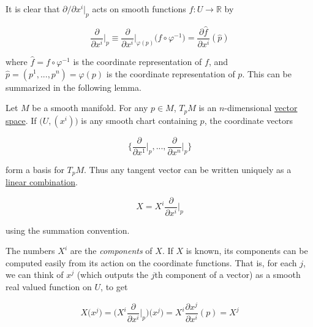 \documentclass{article}
\begin{document}
    It is clear that $\partial / \partial x^i \big|_p $ acts on smooth functions $f: U \to \mathbb{R}$ by

      \begin{equation}
        \frac{\partial}{\partial x^i} \bigg|_p \equiv \frac{\partial}{\partial x^i} \bigg|_{\varphi(p)} \big( f \circ \varphi^{-1} \big) = \frac{\partial \hat{f}}{\partial x^i} (\hat{p})
      \end{equation}

    where $\hat{f} = f \circ \varphi^{-1}$ is the coordinate representation of $f$, and $\hat{p} = (p^1, ..., p^n) = \varphi(p)$ is the coordinate representation of $p$. This can be summarized in the following lemma. 

    \begin{lemma}
      \label{thm:dimension-and-coordinate-basis-of-tpm}
      Let $M$ be a smooth manifold. For any $p \in M$, $T_p M$ is an $n$-dimensional \hyperref[lin-def:vector-space]{vector space}. If $\big( U, (x^i)\big)$ is any smooth chart containing $p$, the coordinate vectors 

        \begin{equation}
          \bigg\{ \frac{\partial}{\partial x^1} \bigg|_p, ..., \frac{\partial}{\partial x^n} \bigg|_p \bigg\}
        \end{equation}

      form a basis for $T_p M$. Thus any tangent vector can be written uniquely as a \hyperref[lin-def:linear-combination]{linear combination}. 

        \begin{equation}
          X = X^i \frac{\partial}{\partial x^i} \bigg|_p
        \end{equation}

      using the summation convention. 
    \end{lemma}

    The numbers $X^i$ are the \textit{components} of $X$. If $X$ is known, its components can be computed easily from its action on the coordinate functions. That is, for each $j$, we can think of $x^j$ (which outputs the $j$th component of a vector) as a smooth real valued function on $U$, to get

      \begin{equation}
        X \big(x^j\big) = \bigg(X^i \frac{\partial}{\partial x^i} \bigg|_p \bigg) \big(x^j \big) = X^i \frac{\partial x^j}{\partial x^i} (p) = X^j
      \end{equation}
\end{document}
